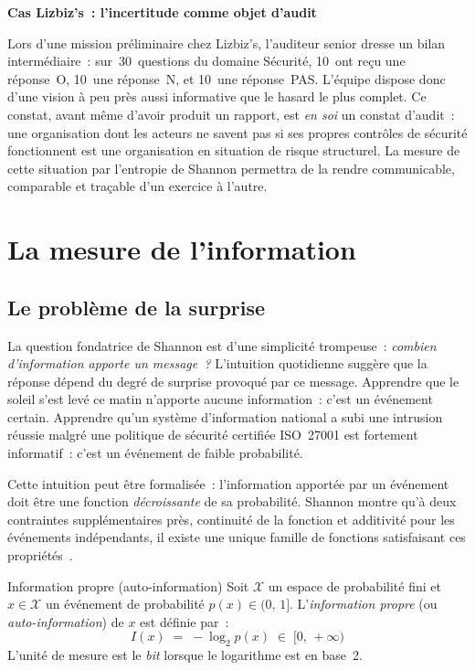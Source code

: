 \begin{boxlizbiz}
\textbf{Cas Lizbiz's~: l'incertitude comme objet d'audit}

Lors d'une mission préliminaire chez Lizbiz's, l'auditeur senior dresse un bilan
intermédiaire~: sur~30~questions du domaine Sécurité, 10~ont reçu une réponse~O,
10~une réponse~N, et 10~une réponse~PAS. L'équipe dispose donc d'une vision à peu
près aussi informative que le hasard le plus complet. Ce constat, avant même
d'avoir produit un rapport, est \emph{en soi} un constat d'audit~: une
organisation dont les acteurs ne savent pas si ses propres contrôles de sécurité
fonctionnent est une organisation en situation de risque structurel. La mesure
de cette situation par l'entropie de Shannon permettra de la rendre communicable,
comparable et traçable d'un exercice à l'autre.
\end{boxlizbiz}

\section{La mesure de l'information}
\label{sec:information}

\subsection{Le problème de la surprise}

La question fondatrice de Shannon est d'une simplicité trompeuse~: \emph{combien
d'information apporte un message~?} L'intuition quotidienne suggère que la réponse
dépend du degré de surprise provoqué par ce message. Apprendre que le soleil s'est
levé ce matin n'apporte aucune information~: c'est un événement certain. Apprendre
qu'un système d'information national a subi une intrusion réussie malgré une
politique de sécurité certifiée ISO~27001 est fortement informatif~: c'est un
événement de faible probabilité.

Cette intuition peut être formalisée~: l'information apportée par un événement
doit être une fonction \emph{décroissante} de sa probabilité. Shannon montre
qu'à deux contraintes supplémentaires près, continuité de la fonction et
additivité pour les événements indépendants, il existe une unique famille de
fonctions satisfaisant ces propriétés~\cite{Shannon1948, Cover2006}.

\begin{boxdef}{Information propre (auto-information)}
Soit $\mathcal{X}$ un espace de probabilité fini et $x \in \mathcal{X}$ un
événement de probabilité $p(x) \in (0,\,1]$. L'\emph{information propre}
(ou \emph{auto-information}) de $x$ est définie par~:
\begin{equation}
  I(x) \;=\; -\log_2 p(x) \;\in\; [0,\,+\infty)
  \label{eq:autopinfo}
\end{equation}
L'unité de mesure est le \emph{bit} lorsque le logarithme est en base~2.
\end{boxdef}

